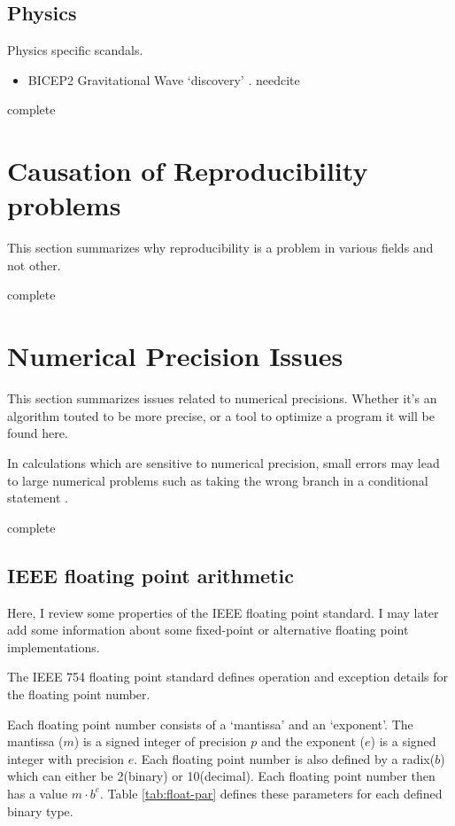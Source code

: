 \documentclass{article}
\newcommand{\complete}{
	\gls{complete}
}
\newcommand{\needcite}{
	\gls{needcite}
}
\begin{document}
\subsection{Physics}

Physics specific scandals.

\begin{itemize}
\item BICEP2 Gravitational Wave `discovery' \cite{dhb-zurich-hp}. \needcite
\end{itemize}

\complete

\section{Causation of Reproducibility problems}

This section summarizes why reproducibility is a problem in various fields and not other.
\complete

\section{Numerical Precision Issues}

This section summarizes issues related to numerical precisions. Whether it's an algorithm touted to be more precise, or a tool to optimize a program it will be found here.

In calculations which are sensitive to numerical precision, small errors may lead to large numerical problems such as taking the wrong branch in a conditional statement \cite{high-precision-arith-in-science}.

\complete

\subsection{IEEE floating point arithmetic}

Here, I review some properties of the IEEE floating point standard. I may later add some information about some fixed-point or alternative floating point implementations.

The IEEE 754 floating point standard \cite{ieee-754-2008,ieee-754-2008-redline} defines operation and exception details for the floating point number.

Each floating point number consists of a `mantissa' and an `exponent'. The mantissa ($m$) is a signed integer of precision $p$ and the exponent ($e$) is a signed integer with precision $e$. Each floating point number is also defined by a radix($b$) which can either be 2(binary) or 10(decimal). Each floating point number then has a value $m\cdot b^e$. Table \ref{tab:float-par} defines these parameters for each defined binary type.
\end{document}
